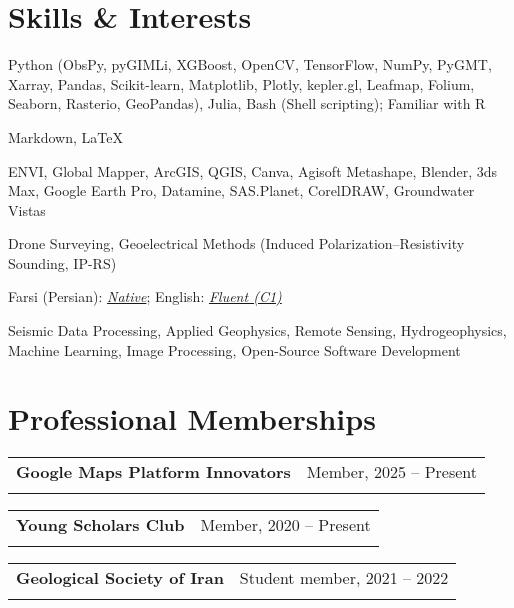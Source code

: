\documentclass[letterpaper,11pt]{article}
\makeatletter
\newcommand{\ressubheading}[4]{
	\begin{tabular*}{6.5in}{l@{\cftdotfill{\cftsecdotsep}\extracolsep{\fill}}r}
		\textbf{#1} & #2 \\
		\textit{#3} & \textit{#4} \\
	\end{tabular*}\vspace{-8pt}
}
\makeatother
\begin{document}
\section{Skills \& Interests}
\begin{description}[itemsep=0pt]
	
	\item[Programming Languages:] 
	Python (ObsPy, pyGIMLi, XGBoost, OpenCV, TensorFlow, NumPy, PyGMT, Xarray, Pandas, Scikit-learn, Matplotlib, Plotly, kepler.gl, Leafmap, Folium, Seaborn, Rasterio, GeoPandas), Julia, Bash (Shell scripting); Familiar with R
	
	\item[Markup Languages:] 
	Markdown, \LaTeX
	
	\item[Software:] 
	ENVI, Global Mapper, ArcGIS, QGIS, Canva, Agisoft Metashape, Blender, 3ds Max, Google Earth Pro, Datamine, SAS.Planet, CorelDRAW, Groundwater Vistas
	
	\item[Field Techniques:] 
	Drone Surveying, Geoelectrical Methods (Induced Polarization–Resistivity Sounding, IP-RS)
	
	\item[Languages:] 
	Farsi (Persian): \textit{\underline{Native}}; English: \textit{\underline{Fluent (C1)}}
	
	\item[Research Interests:] 
	Seismic Data Processing, Applied Geophysics, Remote Sensing, Hydrogeophysics, Machine Learning, Image Processing, Open-Source Software Development
	
\end{description}
    \vspace{-2.0em} 
	
\section{Professional Memberships}
\vspace{-0.5em} 
\ressubheading{Google Maps Platform Innovators}{Member, 2025 – Present}{}{}
\vspace{-0.2em} 
\vspace{-0.5em} 
\ressubheading{Young Scholars Club}{Member, 2020 – Present}{}{}
\vspace{-0.2em} 
\vspace{-0.5em} 
\ressubheading{Geological Society of Iran}{Student member, 2021 – 2022}{}{}
\vspace{-0.2em} 
\vspace{-0.5em} 
\end{document}
